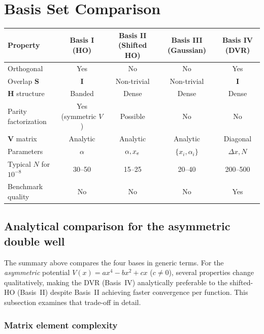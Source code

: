 \section{Basis Set Comparison}\label{sec:comparison}

\begin{center}
\renewcommand{\arraystretch}{1.5}
\begin{tabular}{lcccc}
  \toprule
  Property & Basis I (HO) & Basis II (Shifted HO) & Basis III (Gaussian) & Basis IV (DVR) \\
  \midrule
  Orthogonal          & Yes & No  & No  & Yes \\
  Overlap $\mathbf{S}$ & $\mathbf{I}$ & Non-trivial & Non-trivial & $\mathbf{I}$ \\
  $\mathbf{H}$ structure & Banded & Dense & Dense & Dense \\
  Parity factorization & Yes (symmetric $V$) & Possible & No & No \\
  $\mathbf{V}$ matrix  & Analytic & Analytic & Analytic & Diagonal \\
  Parameters           & $\alpha$ & $\alpha, x_e$ & $\{x_i, \alpha_i\}$ & $\Delta x, N$ \\
  Typical $N$ for $10^{-8}$ & 30--50 & 15--25 & 20--40 & 200--500 \\
  Benchmark quality    & No & No & No & Yes \\
  \bottomrule
\end{tabular}
\end{center}

\subsection{Analytical comparison for the asymmetric double well}\label{sec:basis_asym}

The summary above compares the four bases in generic terms.  For the \emph{asymmetric}
potential $V(x) = ax^4 - bx^2 + cx$ ($c \neq 0$), several properties change qualitatively,
making the DVR (Basis~IV) analytically preferable to the shifted-HO (Basis~II) despite
Basis~II achieving faster convergence per function.  This subsection examines that
trade-off in detail.

\subsubsection{Matrix element complexity}

